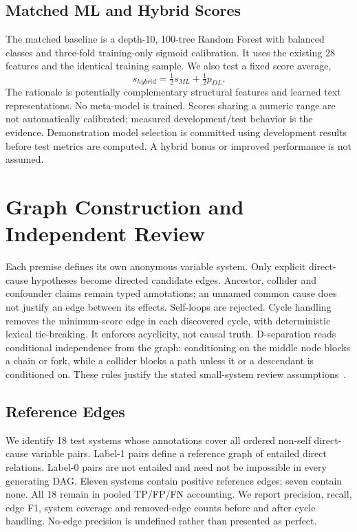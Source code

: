 \documentclass[conference]{IEEEtran}
\begin{document}
\subsection{Matched ML and Hybrid Scores}
The matched baseline is a depth-10, 100-tree Random Forest with balanced classes and three-fold training-only sigmoid calibration. It uses the existing 28 features and the identical training sample. We also test a fixed score average,
\begin{equation}
s_{hybrid}=\tfrac12s_{ML}+\tfrac12p_{DL}.
\end{equation}
The rationale is potentially complementary structural features and learned text representations. No meta-model is trained. Scores sharing a numeric range are not automatically calibrated; measured development/test behavior is the evidence. Demonstration model selection is committed using development results before test metrics are computed. A hybrid bonus or improved performance is not assumed.

\section{Graph Construction and Independent Review}
Each premise defines its own anonymous variable system. Only explicit direct-cause hypotheses become directed candidate edges. Ancestor, collider and confounder claims remain typed annotations; an unnamed common cause does not justify an edge between its effects. Self-loops are rejected. Cycle handling removes the minimum-score edge in each discovered cycle, with deterministic lexical tie-breaking. It enforces acyclicity, not causal truth. D-separation reads conditional independence from the graph: conditioning on the middle node blocks a chain or fork, while a collider blocks a path unless it or a descendant is conditioned on. These rules justify the stated small-system review assumptions~\cite{pearl}.

\subsection{Reference Edges}
We identify 18 test systems whose annotations cover all ordered non-self direct-cause variable pairs. Label-1 pairs define a reference graph of entailed direct relations. Label-0 pairs are not entailed and need not be impossible in every generating DAG. Eleven systems contain positive reference edges; seven contain none. All 18 remain in pooled TP/FP/FN accounting. We report precision, recall, edge F1, system coverage and removed-edge counts before and after cycle handling. No-edge precision is undefined rather than presented as perfect.
\end{document}
